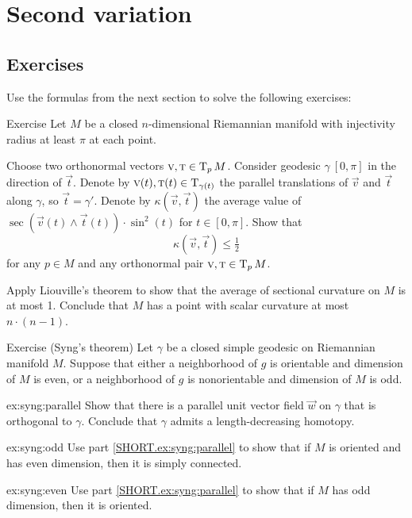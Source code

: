 \chapter{Second variation}

\section{Exercises}

Use the formulas from the next section to solve the following exercises:

\begin{thm}{Exercise}\label{ex:scalar}
Let $M$ be a closed $n$-dimensional Riemannian manifold with injectivity radius at least $\pi$ at each point.

\begin{subthm}{}
Choose two orthonormal vectors $\textsc v,\textsc t\in\operatorname{\rm T}_pM$.
Consider geodesic $\gamma\:[0,\pi]$ in the direction of $\vec t$.
Denote by $\textsc v(t),\textsc t(t)\in\operatorname{\rm T}_{\gamma(t)}$ the parallel translations of $\vec v$ and $\vec t$ along $\gamma$, so $\vec t=\gamma'$.
Denote by $\kappa(\vec v,\vec t)$
the average value of $\sec(\vec v(t)\wedge \vec t(t))\cdot\sin^2(t)$ for $t\in[0,\pi]$.
Show that 
\[\kappa(\vec v,\vec t)\le \tfrac12\]
for any $p\in M$ and any orthonormal pair $\textsc v,\textsc t\in\operatorname{\rm T}_pM$.
\end{subthm}

\begin{subthm}{} Apply Liouville's theorem to show that the average of sectional curvature on $M$ is at most 1.
 Conclude that $M$ has a point with scalar curvature at most $n\cdot (n-1)$. 
\end{subthm}

\end{thm}

\begin{thm}{Exercise (Syng's theorem)}\label{ex:syng}
Let $\gamma$ be a closed simple geodesic on Riemannian manifold $M$.
Suppose that either a neighborhood of $g$ is orientable and dimension of $M$ is even, or a neighborhood of $g$ is nonorientable and dimension of $M$ is odd.

\begin{subthm}{ex:syng:parallel}
Show that there is a parallel unit vector field $\vec w$ on $\gamma$ that is orthogonal to $\gamma$.
Conclude that $\gamma$ admits a length-decreasing homotopy.
\end{subthm}

\begin{subthm}{ex:syng:odd}
Use part \ref{SHORT.ex:syng:parallel} to show that if $M$ is oriented and has even dimension, then it is simply connected.
\end{subthm}

\begin{subthm}{ex:syng:even}
Use part \ref{SHORT.ex:syng:parallel} to show that if $M$  has odd dimension, then it is oriented.
\end{subthm}

\end{thm}

